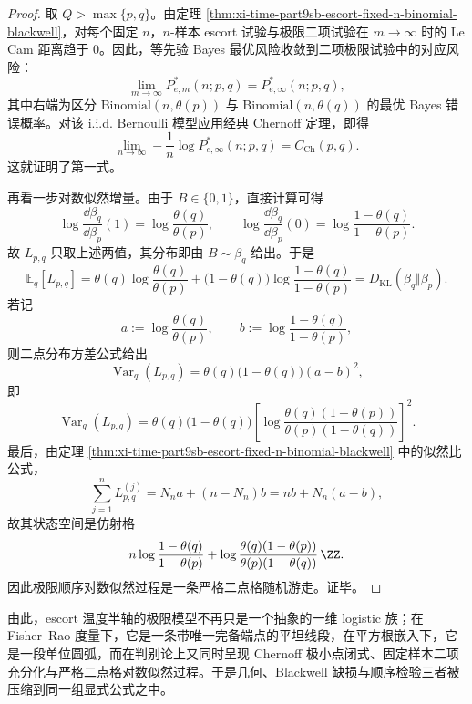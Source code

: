 \begin{proof}
取 \(Q>\max\{p,q\}\)。由定理
\ref{thm:xi-time-part9sb-escort-fixed-n-binomial-blackwell}，对每个固定 \(n\)，\(n\)-样本 escort 试验与极限二项试验在 \(m\to\infty\) 时的 Le Cam 距离趋于 \(0\)。因此，等先验 Bayes 最优风险收敛到二项极限试验中的对应风险：
\[
\lim_{m\to\infty}P_{e,m}^{\ast}(n;p,q)
=
P_{e,\infty}^{\ast}(n;p,q),
\]
其中右端为区分 \(\mathrm{Binomial}(n,\theta(p))\) 与 \(\mathrm{Binomial}(n,\theta(q))\) 的最优 Bayes 错误概率。对该 i.i.d. Bernoulli 模型应用经典 Chernoff 定理，即得
\[
\lim_{n\to\infty}
-\frac1n\log P_{e,\infty}^{\ast}(n;p,q)
=
C_{\mathrm{Ch}}(p,q).
\]
这就证明了第一式。

再看一步对数似然增量。由于 \(B\in\{0,1\}\)，直接计算可得
\[
\log\frac{\dd\beta_q}{\dd\beta_p}(1)=\log\frac{\theta(q)}{\theta(p)},
\qquad
\log\frac{\dd\beta_q}{\dd\beta_p}(0)=\log\frac{1-\theta(q)}{1-\theta(p)}.
\]
故 \(L_{p,q}\) 只取上述两值，其分布即由 \(B\sim\beta_q\) 给出。于是
\[
\mathbb E_q[L_{p,q}]
=
\theta(q)\log\frac{\theta(q)}{\theta(p)}
+
\bigl(1-\theta(q)\bigr)\log\frac{1-\theta(q)}{1-\theta(p)}
=
D_{\mathrm{KL}}(\beta_q\Vert \beta_p).
\]
若记
\[
a:=\log\frac{\theta(q)}{\theta(p)},
\qquad
b:=\log\frac{1-\theta(q)}{1-\theta(p)},
\]
则二点分布方差公式给出
\[
\operatorname{Var}_q(L_{p,q})
=
\theta(q)\bigl(1-\theta(q)\bigr)(a-b)^2,
\]
即
\[
\operatorname{Var}_q(L_{p,q})
=
\theta(q)\bigl(1-\theta(q)\bigr)
\left[
\log\frac{\theta(q)(1-\theta(p))}{\theta(p)(1-\theta(q))}
\right]^2.
\]
最后，由定理 \ref{thm:xi-time-part9sb-escort-fixed-n-binomial-blackwell} 中的似然比公式，
\[
\sum_{j=1}^n L_{p,q}^{(j)}
=
N_n a+(n-N_n)b
=
n b+N_n(a-b),
\]
故其状态空间是仿射格
\[
n\log\frac{1-\theta(q)}{1-\theta(p)}
+
\log\frac{\theta(q)(1-\theta(p))}{\theta(p)(1-\theta(q))}\,\ZZ.
\]
因此极限顺序对数似然过程是一条严格二点格随机游走。证毕。
\end{proof}

由此，escort 温度半轴的极限模型不再只是一个抽象的一维 logistic 族；在 Fisher--Rao 度量下，它是一条带唯一完备端点的平坦线段，在平方根嵌入下，它是一段单位圆弧，而在判别论上又同时呈现 Chernoff 极小点闭式、固定样本二项充分化与严格二点格对数似然过程。于是几何、Blackwell 缺损与顺序检验三者被压缩到同一组显式公式之中。

\endinput
